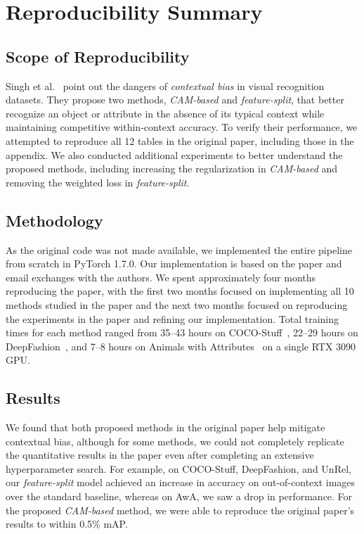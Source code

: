 
\section*{\centering Reproducibility Summary}

\subsection*{Scope of Reproducibility}
Singh et al.~\cite{Singh_2020_CVPR} point out the dangers of \emph{contextual bias} in visual recognition datasets. They propose two methods, \emph{CAM-based} and \emph{feature-split}, that better recognize an object or attribute in the absence of its typical context while maintaining competitive within-context accuracy. 
To verify their performance, we attempted to reproduce all 12 tables in the original paper, including those in the appendix. We also conducted additional experiments to better understand the proposed methods, including increasing the regularization in \textit{CAM-based} and removing the weighted loss in \textit{feature-split}.

\subsection*{Methodology}
As the original code was not made available, we implemented the entire pipeline from scratch in PyTorch 1.7.0. Our implementation is based on the paper and email exchanges with the authors.
We spent approximately four months reproducing the paper, with the first two months focused on implementing all 10 methods studied in the paper and the next two months focused on reproducing the experiments in the paper and refining our implementation. Total training times for each method ranged from 35--43 hours on COCO-Stuff~\cite{caesar2018cvpr}, 22--29 hours on DeepFashion~\cite{liuLQWTcvpr16DeepFashion}, and 7--8 hours on Animals with Attributes~\cite{AwA} on a single RTX 3090 GPU.

\subsection*{Results}
We found that both proposed methods in the original paper help mitigate contextual bias, although for some methods, we could not completely replicate the quantitative results in the paper even after completing an extensive hyperparameter search. For example, on COCO-Stuff, DeepFashion, and UnRel, our \emph{feature-split} model achieved an increase in accuracy on out-of-context images over the standard baseline, whereas on AwA, we saw a drop in performance. For the proposed \emph{CAM-based} method, we were able to reproduce the original paper’s results to within 0.5\% mAP.

